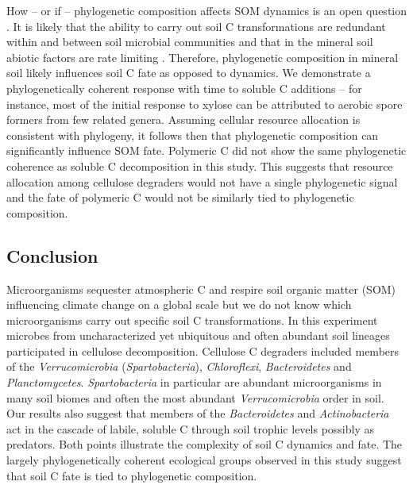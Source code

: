 How -- or if -- phylogenetic composition affects SOM dynamics is an open
question \citep{Schimel_2012}. It is likely that the ability to carry out soil
C transformations are redundant within and between soil microbial communities
and that in the mineral soil abiotic factors are rate limiting
\citep{Schimel_2012}. Therefore, phylogenetic composition in mineral soil
likely influences soil C fate as opposed to dynamics. We demonstrate
a phylogenetically coherent response with time to soluble C additions -- for
instance, most of the initial response to xylose can be attributed to aerobic
spore formers from few related genera. Assuming cellular resource allocation is
consistent with phylogeny, it follows then that phylogenetic composition can
significantly influence SOM fate. Polymeric C did not show the same
phylogenetic coherence as soluble C decomposition in this study. This suggests
that resource allocation among cellulose degraders would not have a single
phylogenetic signal and the fate of polymeric C would not be similarly tied to
phylogenetic composition.

\subsection{Conclusion} 
Microorganisms sequester atmospheric C and respire soil organic matter (SOM)
influencing climate change on a global scale but we do not know which
microorganisms carry out specific soil C transformations. In this experiment
microbes from uncharacterized yet ubiquitous and often abundant soil lineages
participated in cellulose decomposition. Cellulose C degraders included members
of the \textit{Verrucomicrobia} (\textit{Spartobacteria}),
\textit{Chloroflexi}, \textit{Bacteroidetes} and \textit{Planctomycetes}.
\textit{Spartobacteria} in particular are abundant microorganisms in many soil
biomes and often the most abundant \textit{Verrucomicrobia} order in soil. Our
results also suggest that members of the \textit{Bacteroidetes} and
\textit{Actinobacteria} act in the cascade of labile, soluble C through soil
trophic levels possibly as predators. Both points illustrate the
complexity of soil C dynamics and fate. The largely phylogenetically
coherent ecological groups observed in this study suggest that soil C fate
is tied to phylogenetic composition.
